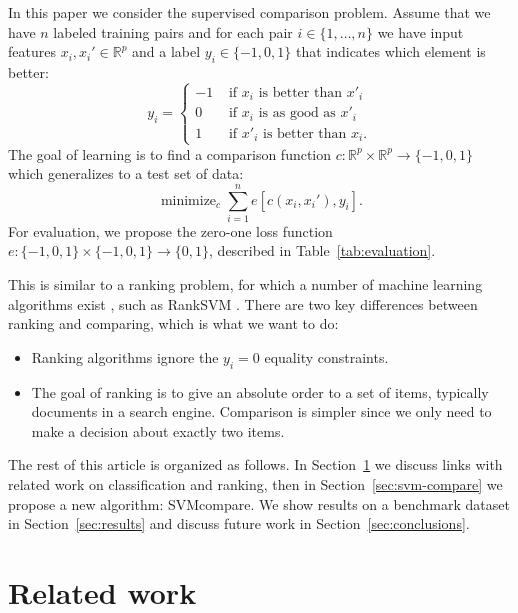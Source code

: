 \documentclass{article}
\newcommand{\RR}{\mathbb R}
\DeclareMathOperator*{\minimize}{minimize}
\begin{document}
In this paper we consider the supervised comparison problem. Assume
that we have $n$ labeled training pairs and for each pair
$i\in\{1,\dots,n\}$ we have input features $x_i,x_i'\in\RR^p$ and a
label $y_i\in\{-1,0,1\}$ that indicates which element is better:
\begin{equation}
  \label{eq:z}
  y_i =
  \begin{cases}
    -1 & \text{ if $x_i$ is better than $x'_i$}\\
    0 & \text{ if $x_i$ is as good as $x'_i$}\\
    1 & \text{ if $x'_i$ is better than $x_i$}.
  \end{cases}
\end{equation}
The goal of learning is to find a comparison function $c:\RR^p \times
\RR^p \rightarrow \{-1,0,1\}$ which generalizes to a test set of data:
\begin{equation}
  \minimize_{c} 
  \sum_{i=1}^n
  e\left[ c(x_i, x_i'), y_i \right].
\end{equation}
For evaluation, we propose the zero-one loss function
$e:\{-1,0,1\}\times\{-1,0,1\}\rightarrow\{0,1\}$, described in
Table~\ref{tab:evaluation}.

This is similar to a ranking problem, for which a number of machine
learning algorithms exist \citep{learning-to-rank}, such as RankSVM
\citep{ranksvm}. There are two key differences between ranking and
comparing, which is what we want to do:
\begin{itemize}
\item Ranking algorithms ignore the $y_i=0$ equality constraints.
\item The goal of ranking is to give an absolute order to a set of
  items, typically documents in a search engine. Comparison is simpler
  since we only need to make a decision about exactly two items.
\end{itemize}

The rest of this article is organized as follows. In
Section~\ref{sec:related} we discuss links with related work on
classification and ranking, then in Section~\ref{sec:svm-compare} we
propose a new algorithm: SVMcompare. We show results on a benchmark
dataset in Section~\ref{sec:results} and discuss future work in
Section~\ref{sec:conclusions}.

\section{Related work}
\label{sec:related}
\end{document}
